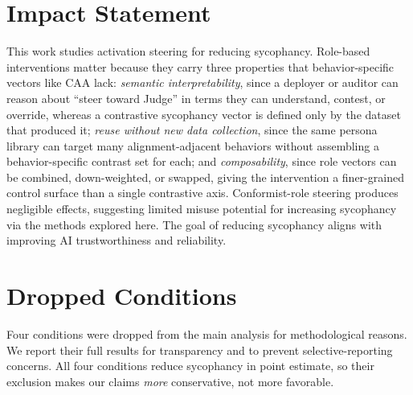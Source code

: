 \documentclass{article}
\theoremstyle{plain}
\theoremstyle{definition}
\theoremstyle{remark}
\begin{document}
\section*{Impact Statement}
This work studies activation steering for reducing sycophancy. Role-based interventions matter because they carry three properties that behavior-specific vectors like CAA lack: \emph{semantic interpretability}, since a deployer or auditor can reason about ``steer toward Judge'' in terms they can understand, contest, or override, whereas a contrastive sycophancy vector is defined only by the dataset that produced it; \emph{reuse without new data collection}, since the same persona library can target many alignment-adjacent behaviors without assembling a behavior-specific contrast set for each; and \emph{composability}, since role vectors can be combined, down-weighted, or swapped, giving the intervention a finer-grained control surface than a single contrastive axis. Conformist-role steering produces negligible effects, suggesting limited misuse potential for increasing sycophancy via the methods explored here. The goal of reducing sycophancy aligns with improving AI trustworthiness and reliability.




\newpage
\appendix
\onecolumn

\section{Dropped Conditions}\label{app:dropped}

Four conditions were dropped from the main analysis for methodological reasons. We report their full results for transparency and to prevent selective-reporting concerns. All four conditions reduce sycophancy in point estimate, so their exclusion makes our claims \emph{more} conservative, not more favorable.
\end{document}
